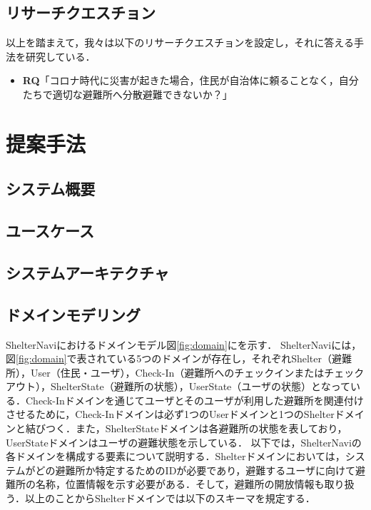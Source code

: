 \documentclass[technicalreport,dvipdfmx]{ieicej}
\begin{document}
\subsection{リサーチクエスチョン}
以上を踏まえて，我々は以下のリサーチクエスチョンを設定し，それに答える手法を研究している．

\begin{itemize}
     \item{\textbf{RQ}「コロナ時代に災害が起きた場合，住民が自治体に頼ることなく，自分たちで適切な避難所へ分散避難できないか？」}
\end{itemize}

\section{提案手法}
\subsection{システム概要}

\subsection{ユースケース}

\subsection{システムアーキテクチャ}

\subsection{ドメインモデリング}
ShelterNaviにおけるドメインモデル図\ref{fig:domain}にを示す．
ShelterNaviには，図\ref{fig:domain}で表されている5つのドメインが存在し，それぞれShelter（避難所），User（住民・ユーザ），Check-In（避難所へのチェックインまたはチェックアウト），ShelterState（避難所の状態），UserState（ユーザの状態）となっている．Check-Inドメインを通じてユーザとそのユーザが利用した避難所を関連付けさせるために，Check-Inドメインは必ず1つのUserドメインと1つのShelterドメインと結びつく．また，ShelterStateドメインは各避難所の状態を表しており，UserStateドメインはユーザの避難状態を示している．
以下では，ShelterNaviの各ドメインを構成する要素について説明する．Shelterドメインにおいては，システムがどの避難所か特定するためのIDが必要であり，避難するユーザに向けて避難所の名称，位置情報を示す必要がある．そして，避難所の開放情報も取り扱う．以上のことからShelterドメインでは以下のスキーマを規定する．
\end{document}

